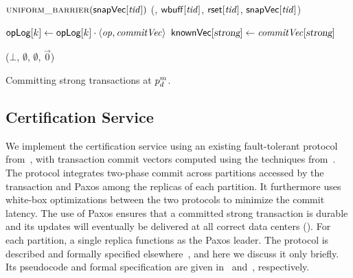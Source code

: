 \begin{algorithm}[t]
  \begin{algorithmic}[1]
    \small
    \Function{\COMMITRED}{\tx}\label{line:commitred}
      \State $\MAKEUNIFORM(\vecsnapshottime[\tx])$\label{line:uniformred}
      \State \Return
        \CERTIFY(\tx, $\writeset[\tx]$, $\readset[\tx]$, $\vecsnapshottime[\tx]$) \label{line:certifyred}
    \EndFunction

    \SpaceHandler

    \Upon[\DELIVERUPD($W$)]\label{line:deliverred}
      \State $\store[k] \gets \store[k] \cdot \langle \op, \commitvector \rangle$\label{line:addred}
      \EndFor
      \State $\replicavectorclock[\red] \gets \commitvector[\red]$\label{line:setred}
      \EndFor
    \EndUpon
      

    \SpaceHandler

    \Function{\RHEARTBEAT}{$ $} \label{line:stronghb}
      \State \Return \CERTIFY($\bot$, $\emptyset$, $\emptyset$, $\vec{0}$)
    \EndFunction

  \end{algorithmic}
  \caption{Committing strong transactions at $\partition^m_d$.}
  \label{alg:txncoord2}
\end{algorithm}

\subsection{Certification Service}
\label{sec:certification}



We implement the certification service using an existing fault-tolerant protocol
from~\cite{discpaper}, with transaction commit vectors computed using the
techniques from~\cite{multicast-dsn19}. The protocol integrates two-phase commit
across partitions accessed by the transaction and Paxos among the replicas of
each partition. It furthermore uses white-box optimizations between the two
protocols to minimize the commit latency.  The use of Paxos ensures that a
committed strong transaction is durable and its updates will eventually be
delivered at all correct data centers
(). For each partition, a single replica
functions as the Paxos leader. The protocol is described and formally specified
elsewhere~\cite{discpaper}, and here we discuss it only briefly. Its pseudocode
and formal specification are given 
in~\tr{\ref{section:unistore-protocol}}{\nappfull}
and~\tr{\ref{section:tcs}}{\napptcs}, respectively.

